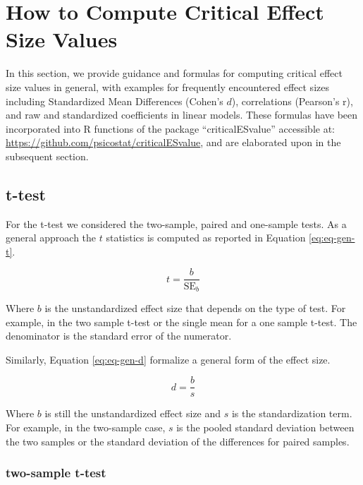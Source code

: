\documentclass[
  man]{apa7}
\begin{document}
\section{How to Compute Critical Effect Size Values}\label{how-to-compute-critical-effect-size-values}

In this section, we provide guidance and formulas for computing critical effect size values in general, with examples for frequently encountered effect sizes including Standardized Mean Differences (Cohen's \(d\)), correlations (Pearson's r), and raw and standardized coefficients in linear models. These formulas have been incorporated into R functions of the package ``criticalESvalue'' accessible at: \url{https://github.com/psicostat/criticalESvalue}, and are elaborated upon in the subsequent section.

\subsection{t-test}\label{t-test}

For the t-test we considered the two-sample, paired and one-sample tests. As a general approach the \(t\) statistics is computed as reported in Equation \eqref{eq:eq-gen-t}.

\begin{equation}
    \label{eq:eq-gen-t}
    t = \frac{b}{\text{SE}_{b}}
\end{equation}

Where \(b\) is the unstandardized effect size that depends on the type of test. For example, in the two sample t-test or the single mean for a one sample t-test. The denominator is the standard error of the numerator.

Similarly, Equation \eqref{eq:eq-gen-d} formalize a general form of the effect size.

\begin{equation}
    \label{eq:eq-gen-d}
    d = \frac{b}{s}
\end{equation}

Where \(b\) is still the unstandardized effect size and \(s\) is the standardization term. For example, in the two-sample case, \(s\) is the pooled standard deviation between the two samples or the standard deviation of the differences for paired samples.

\subsubsection{two-sample t-test}\label{two-sample-t-test}
\end{document}

